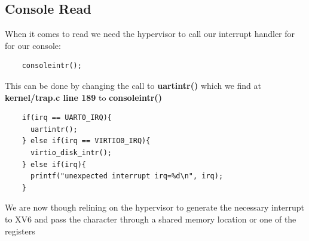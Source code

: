 \subsection{Console Read}
\label{imp:console-read}

When it comes to read we need the hypervisor to call our interrupt handler for for our console:

\begin{verbatim}
    consoleintr();
\end{verbatim}

This can be done by changing the call to \textbf{uartintr()} which we find at \textbf{kernel/trap.c line 189} to \textbf{consoleintr()}
\begin{verbatim}
    if(irq == UART0_IRQ){
      uartintr();
    } else if(irq == VIRTIO0_IRQ){
      virtio_disk_intr();
    } else if(irq){
      printf("unexpected interrupt irq=%d\n", irq);
    }
\end{verbatim}

We are now though relining on the hypervisor to generate the necessary interrupt to XV6  and pass the character through a shared memory location or one of the registers

